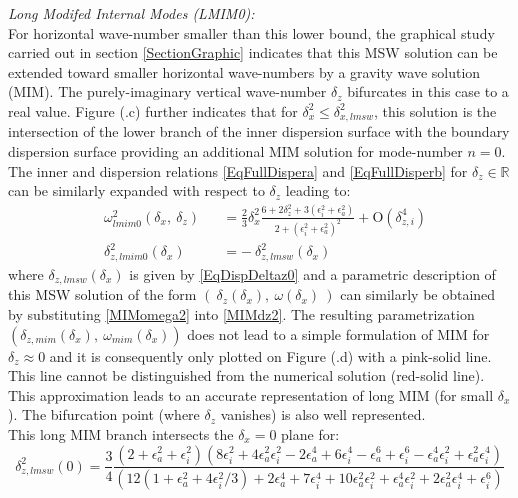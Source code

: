 \documentclass[a4paper,11pt]{article}
\begin{document}
\textit{Long Modifed Internal Modes (LMIM0):}\\
For horizontal wave-number smaller than this lower bound, the graphical study carried out in section \ref{SectionGraphic} indicates that this MSW solution can be extended toward smaller horizontal wave-numbers by a gravity wave solution (MIM). The purely-imaginary vertical wave-number $\delta_z$ bifurcates in this case to a real value. Figure (.c) further indicates that for $\delta_x^2 \leq \delta_{x,lmsw}^2$, this solution is the intersection of the lower branch of the inner dispersion surface with the boundary dispersion surface providing an additional MIM solution for mode-number $n=0$. 
The inner and dispersion relations \ref{EqFullDispera} and \ref{EqFullDisperb} for $\delta_z\in\mathbb{R}$ can be similarly expanded with respect to $\delta_z$ leading to:
\begin{subequations}
	\begin{alignat}{2}
	\label{MIMomega2}
     	& \omega_{lmim0}^2(\delta_x,\ \delta_z) &&= \frac{2}{3}\delta_x^2 
 		\frac{6+2\delta_z^2+3(\epsilon_i^2+\epsilon_a^2)}
 		{2+(\epsilon_i^2+\epsilon_a^2)^2}
 		+ \mathrm{O}(\delta_{z,i}^4)\\[3mm]
	\label{MIMdz2}
 	 &\delta_{z,lmim0}^2(\delta_x) &&= -\ \delta_{z,lmsw}^2(\delta_x)
 	\end{alignat}
\end{subequations}
where $\delta_{z,lmsw}(\delta_x)$ is given by \ref{EqDispDeltaz0} and a parametric description of this MSW solution of the form $(\ \delta_z(\delta_x),\ \omega(\delta_x)\ )$ can similarly be obtained by substituting \ref{MIMomega2} into \ref{MIMdz2}. The resulting parametrization $(\delta_{z,mim}(\delta_x),\ \omega_{mim}(\delta_x))$ does not lead to a simple formulation of MIM for $\delta_z\approx0$ and it is consequently only plotted on Figure (.d) with a pink-solid line. This line cannot be distinguished from the numerical solution (red-solid line). This approximation leads to an accurate representation of long MIM (for small $\delta_x$). The bifurcation point (where $\delta_z$ vanishes) is also well represented.\\
This long MIM branch intersects the $\delta_x=0$ plane for:
\begin{equation}
	\label{EqDispDeltaz0MIM}
 		\delta_{z,lmsw}^2(0)
 		=\frac{3}{4}
 		\frac{
 		(2+\epsilon_a^2+\epsilon_i^2)
 		\left(
 		8\epsilon_i^2+4\epsilon_a^2\epsilon_i^2
 		-2\epsilon_a^4+6\epsilon_i^4
 		-\epsilon_a^6+\epsilon_i^6
 		-\epsilon_a^4\epsilon_i^2
 		+\epsilon_a^2\epsilon_i^4
 		\right)
 		}
 		{
 		\left(12(1+\epsilon_a^2+4\epsilon_i^2/3)
 		+2\epsilon_a^4+7\epsilon_i^4
 		+10\epsilon_a^2\epsilon_i^2
 		+\epsilon_a^4\epsilon_i^2
 		+2\epsilon_a^2\epsilon_i^4
 		+\epsilon_i^6 \right)
 		}
\end{equation}
\end{document}
